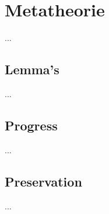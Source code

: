 \chapter{Metatheorie}
\label{hoofdstuk:metatheorie}
... 

\section{Lemma's}
...

\section{Progress}
...

\section{Preservation}
...

